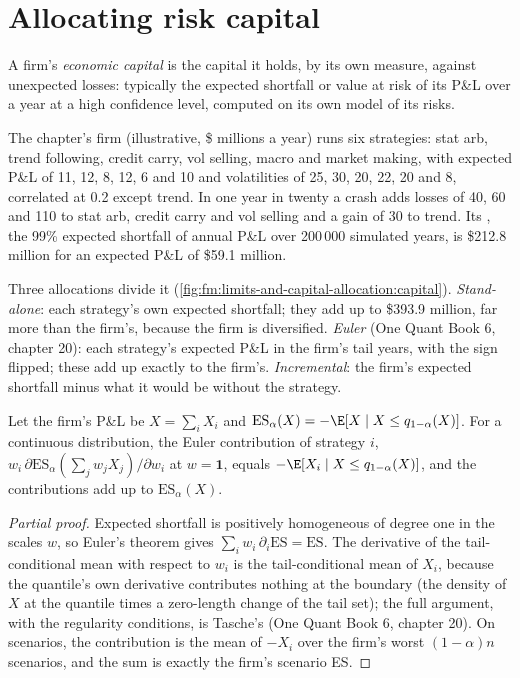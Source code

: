 \section{Allocating risk capital}

\begin{definition}\label{def:fm:limits-and-capital-allocation:ec}
A firm's \emph{economic capital} is the capital it holds, by its own measure, against unexpected losses: typically the
expected shortfall or value at risk of its P\&L over a year at a high confidence level, computed on its own model of its risks.
\end{definition}

The chapter's firm (illustrative, \$ millions a year) runs six strategies: stat arb, trend following, credit carry, vol selling, macro and market
making, with expected P\&L of 11, 12, 8, 12, 6 and 10 and volatilities of 25, 30, 20, 22, 20 and 8, correlated at 0.2 except trend. In one year in
twenty a crash adds losses of 40, 60 and 110 to stat arb, credit carry and vol selling and a gain of 30 to trend. Its , the 99\%
expected shortfall of annual P\&L over 200\,000 simulated years, is \$212.8 million for an expected P\&L of \$59.1 million.

Three allocations divide it (\cref{fig:fm:limits-and-capital-allocation:capital}). \emph{Stand-alone}: each strategy's own expected shortfall;
they add up to \$393.9 million, far more than the firm's, because the firm is diversified. \emph{Euler} (One Quant Book 6, chapter 20): each
strategy's expected P\&L in the firm's tail years, with the sign flipped; these add up exactly to the firm's. \emph{Incremental}: the firm's
expected shortfall minus what it would be without the strategy.

\begin{proposition}\label{prop:fm:limits-and-capital-allocation:euler}
Let the firm's P\&L be $X=\sum_iX_i$ and $\mathrm{ES}_\alpha(X)=-\E[X\mid X\le q_{1-\alpha}(X)]$. For a continuous distribution, the Euler
contribution of strategy $i$, $w_i\,\partial\mathrm{ES}_\alpha(\sum_jw_jX_j)/\partial w_i$ at $w=\mathbf 1$, equals
$-\E[X_i\mid X\le q_{1-\alpha}(X)]$, and the contributions add up to $\mathrm{ES}_\alpha(X)$.
\end{proposition}

\begin{proof}[Partial proof]
Expected shortfall is positively homogeneous of degree one in the scales $w$, so Euler's theorem gives $\sum_iw_i\,\partial_i\mathrm{ES}=\mathrm{ES}$.
The derivative of the tail-conditional mean with respect to $w_i$ is the tail-conditional mean of $X_i$, because the quantile's own derivative
contributes nothing at the boundary (the density of $X$ at the quantile times a zero-length change of the tail set); the full argument, with the
regularity conditions, is Tasche's (One Quant Book 6, chapter 20). On scenarios, the contribution is the mean of $-X_i$ over the firm's worst
$(1-\alpha)n$ scenarios, and the sum is exactly the firm's scenario ES.
\end{proof}

